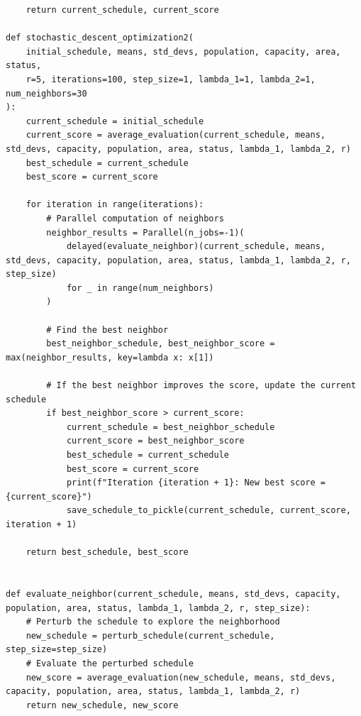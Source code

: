 \documentclass{article}
\begin{document}
\begin{verbatim}
    return current_schedule, current_score

def stochastic_descent_optimization2(
    initial_schedule, means, std_devs, population, capacity, area, status,
    r=5, iterations=100, step_size=1, lambda_1=1, lambda_2=1, num_neighbors=30
):
    current_schedule = initial_schedule
    current_score = average_evaluation(current_schedule, means, std_devs, capacity, population, area, status, lambda_1, lambda_2, r)
    best_schedule = current_schedule
    best_score = current_score

    for iteration in range(iterations):
        # Parallel computation of neighbors
        neighbor_results = Parallel(n_jobs=-1)(
            delayed(evaluate_neighbor)(current_schedule, means, std_devs, capacity, population, area, status, lambda_1, lambda_2, r, step_size)
            for _ in range(num_neighbors)
        )

        # Find the best neighbor
        best_neighbor_schedule, best_neighbor_score = max(neighbor_results, key=lambda x: x[1])

        # If the best neighbor improves the score, update the current schedule
        if best_neighbor_score > current_score:
            current_schedule = best_neighbor_schedule
            current_score = best_neighbor_score
            best_schedule = current_schedule
            best_score = current_score
            print(f"Iteration {iteration + 1}: New best score = {current_score}")
            save_schedule_to_pickle(current_schedule, current_score, iteration + 1)

    return best_schedule, best_score


def evaluate_neighbor(current_schedule, means, std_devs, capacity, population, area, status, lambda_1, lambda_2, r, step_size):
    # Perturb the schedule to explore the neighborhood
    new_schedule = perturb_schedule(current_schedule, step_size=step_size)
    # Evaluate the perturbed schedule
    new_score = average_evaluation(new_schedule, means, std_devs, capacity, population, area, status, lambda_1, lambda_2, r)
    return new_schedule, new_score



\end{verbatim}

\newpage
\printbibliography
\end{document}
